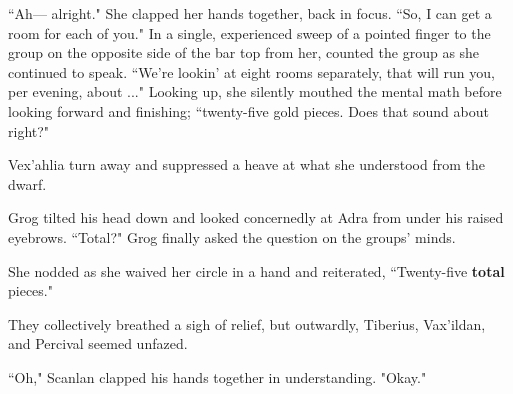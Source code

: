 ``Ah--- alright." She clapped her hands together, back in focus. ``So, I can get a room for each of you." In a single, experienced sweep of a pointed finger to the group on the opposite side of the bar top from her, counted the group as she continued to speak. ``We're lookin' at eight rooms separately, that will run you, per evening, about ..." Looking up, she silently mouthed the mental math before looking forward and finishing; ``twenty-five gold pieces. Does that sound about right?"

Vex'ahlia turn away and suppressed a heave at what she understood from the dwarf.

Grog tilted his head down and looked concernedly at Adra from under his raised eyebrows. ``Total?" Grog finally asked the question on the groups' minds.

She nodded as she waived her circle in a hand and reiterated, ``Twenty-five \textbf{total} pieces." 

They collectively breathed a sigh of relief, but outwardly, Tiberius, Vax'ildan, and Percival seemed unfazed.

``Oh," Scanlan clapped his hands together in understanding. "Okay."



\newpage

